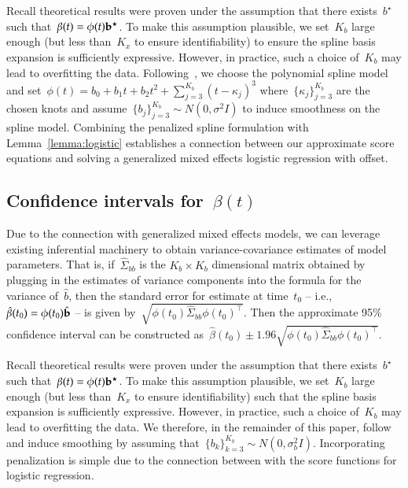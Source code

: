 \documentclass[11pt]{amsart}
\begin{document}
Recall theoretical results were proven under the assumption that there exists~$b^\star$ such that~$\beta(t) = \phi(t) {\bf b}^\star$. To make this assumption plausible, we set~$K_b$ large enough (but less than~$K_x$ to ensure identifiability) to ensure the spline basis expansion is sufficiently expressive. However, in practice, such a choice of~$K_b$ may lead to overfitting the data. Following~\cite{Goldsmith2011}, we choose the polynomial spline model and set~$\phi(t) = b_0 + b_1 t + b_2 t^2 + \sum_{j=3}^{K_b} (t-\kappa_j)^3$ where~$\{ \kappa_j \}_{j=3}^{K_b}$ are the chosen knots and assume~$\{ b_j \}_{j=3}^{K_b} \sim N(0, \sigma^2 I)$ to induce smoothness on the spline model.  Combining the penalized spline formulation with Lemma~\ref{lemma:logistic} establishes a connection between our approximate score equations and solving a generalized mixed effects logistic regression with offset.

\subsection{Confidence intervals for~$\beta(t)$}

Due to the connection with generalized mixed effects models, we can leverage existing inferential machinery to obtain variance-covariance estimates of model parameters. That is, if~$\hat \Sigma_{bb}$ is the $K_b \times K_b$ dimensional matrix obtained by plugging in the estimates of variance components into the formula for the variance of~$\hat b$, then the standard error for estimate at time~$t_0$ -- i.e., ~$\hat \beta (t_0) = \phi(t_0) \hat {\bf b}$ -- is given by~$\sqrt{ \phi (t_0 ) \hat \Sigma_{bb} \phi(t_0)^\top}$.  Then the approximate 95\% confidence interval can be constructed as~$\hat \beta (t_0) \pm 1.96 \sqrt{\phi (t_0) \hat \Sigma_{bb} \phi(t_0)^\top}$.

Recall theoretical results were proven under the assumption that there exists~$b^\star$ such that~$\beta(t) = \phi(t) {\bf b}^\star$. To make this assumption plausible, we set~$K_b$ large enough (but less than~$K_x$ to ensure identifiability) such that the spline basis expansion is sufficiently expressive. However, in practice, such a choice of~$K_b$ may lead to overfitting the data. We therefore, in the remainder of this paper, follow~\cite{GoldSmith2015} and induce smoothing by assuming that~$\{ b_k \}_{k=3}^{K_b} \sim N(0, \sigma_b^2 I)$. Incorporating penalization is simple due to the connection between with the score functions for logistic regression.
\end{document}
